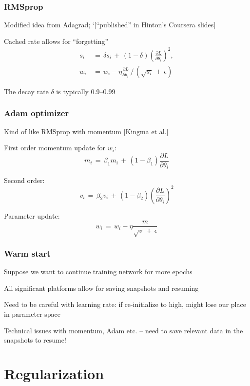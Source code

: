 \documentclass[xcolor=dvipsnames]{beamer}
\begin{document}
 \begin{frame}
   \frametitle{RMSprop}
   \bi
\item Modified idea from Adagrad; `[``published'' in Hinton's Coursera
  slides]
\item Cached rate allows for ``forgetting''
  \begin{align*}
    s_i\,&=\,\delta s_i\,+\,(1-\delta)\left(\frac{\partial L}{\partial
           \theta_i}\right)^2,\\
    w_i\,&=\,w_i-\eta \frac{\partial L}{\partial \theta_i}\,/\,
\left(\sqrt{s_i}\,+\,\epsilon\right)
  \end{align*}
\item The decay rate $\delta$ is typically 0.9--0.99
\ei
 \end{frame}

 \begin{frame}
   \frametitle{Adam optimizer}
\bi
\item Kind of like RMSprop with momentum [Kingma et al.]
\item First order momentum update for $w_i$:
\[m_i\,=\,\beta_1m_i\,+\,(1-\beta_1)\frac{\partial L}{\partial \theta_i}
\]
\item Second order:
\[v_i\,=\,\beta_2v_i\,+\,(1-\beta_2)\left(\frac{\partial L}{\partial \theta_i}\right)^2
\]
\item Parameter update:
\[w_i\,=\,w_i-\eta \frac{m}{\sqrt{v}\,+\,\epsilon}
\]
\ei
   
 \end{frame}





\begin{frame}
  \frametitle{Warm start}
  \bi
\item Suppose we want to continue training network for more epochs
\item All significant platforms allow for saving snapshots and
  resuming
\item Need to be careful with learning rate: if re-initialize to high,
  might lose our place in parameter space
\item Technical issues with momentum, Adam etc. -- need to save
  relevant data in the snapshots to resume!
\ei
\end{frame}


\section{Regularization}
\end{document}
